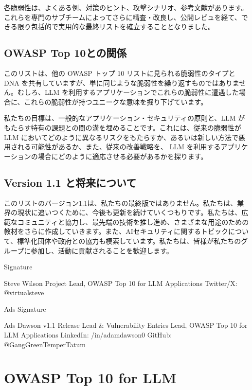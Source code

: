 \documentclass[
]{article}
\begin{document}
各脆弱性は、よくある例、対策のヒント、攻撃シナリオ、参考文献があります。これらを専門のサブチームによってさらに精査・改良し、公開レビュを経て、できる限り包括的で実用的な最終リストを確立することとなりました。

\subsection{OWASP Top
10との関係}\label{owasp-top-10ux3068ux306eux95a2ux4fc2}

このリストは、他の OWASP トップ 10 リストに見られる脆弱性のタイプと DNA
を共有していますが、単に同じような脆弱性を繰り返すものではありません。むしろ、LLM
を利用するアプリケーションでこれらの脆弱性に遭遇した場合に、これらの脆弱性が持つユニークな意味を掘り下げています。

私たちの目標は、一般的なアプリケーション・セキュリティの原則と、LLM
がもたらす特有の課題との間の溝を埋めることです。これには、従来の脆弱性が
LLM
においてどのように異なるリスクをもたらすか、あるいは新しい方法で悪用される可能性があるか、また、従来の改善戦略を、
LLM
を利用するアプリケーションの場合にどのように適応させる必要があるかを探ります。

\subsection{Version 1.1
と将来について}\label{version-1.1-ux3068ux5c06ux6765ux306bux3064ux3044ux3066}

このリストのバージョン1.1は、私たちの最終版ではありません。私たちは、業界の現状に追いつくために、今後も更新を続けていくつもりです。私たちは、広範なコミュニティと協力し、最先端の技術を推し進め、さまざまな用途のための教材をさらに作成していきます。また、AIセキュリティに関するトピックについて、標準化団体や政府との協力も模索しています。私たちは、皆様が私たちのグループに参加し、活動に貢献されることを歓迎します。

Signature

Steve Wilson Project Lead, OWASP Top 10 for LLM Applications Twitter/X:
@virtualsteve

Ads Signature

Ads Dawson v1.1 Release Lead \& Vulnerability Entries Lead, OWASP Top 10
for LLM Applications LinkedIn: /in/adamdawson0 GitHub:
@GangGreenTemperTatum

\section{OWASP Top 10 for LLM}\label{owasp-top-10-for-llm}
\end{document}
